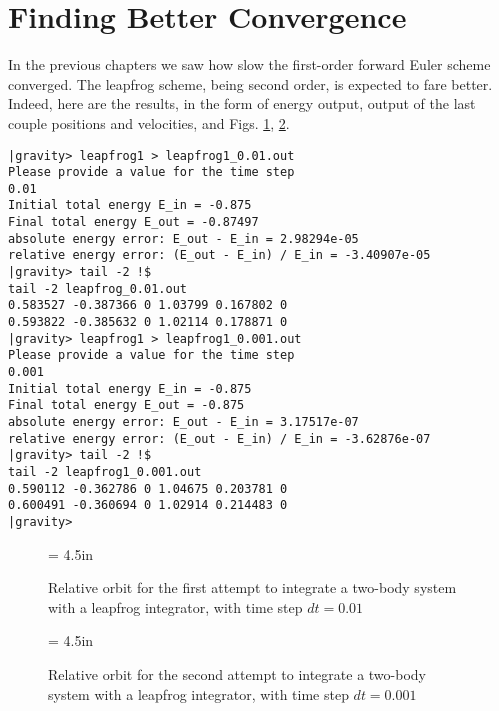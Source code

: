 \section{Finding Better Convergence}

In the previous chapters we saw how slow the first-order forward Euler
scheme converged.  The leapfrog scheme, being second order, is
expected to fare better.  Indeed, here are the results, in the form of
energy output, output of the last couple positions and velocities, and
Figs. \ref{fig:leap1-0.01}, \ref{fig:leap1-0.001}.

\begin{small}
\begin{verbatim}
|gravity> leapfrog1 > leapfrog1_0.01.out
Please provide a value for the time step
0.01
Initial total energy E_in = -0.875
Final total energy E_out = -0.87497
absolute energy error: E_out - E_in = 2.98294e-05
relative energy error: (E_out - E_in) / E_in = -3.40907e-05
|gravity> tail -2 !$
tail -2 leapfrog_0.01.out
0.583527 -0.387366 0 1.03799 0.167802 0
0.593822 -0.385632 0 1.02114 0.178871 0
|gravity> leapfrog1 > leapfrog1_0.001.out
Please provide a value for the time step
0.001
Initial total energy E_in = -0.875
Final total energy E_out = -0.875
absolute energy error: E_out - E_in = 3.17517e-07
relative energy error: (E_out - E_in) / E_in = -3.62876e-07
|gravity> tail -2 !$
tail -2 leapfrog1_0.001.out
0.590112 -0.362786 0 1.04675 0.203781 0
0.600491 -0.360694 0 1.02914 0.214483 0
|gravity>
\end{verbatim}
\end{small}

\begin{figure}[htb]
\begin{center}
\epsfxsize = 4.5in
\caption[Two-body orbit with a leapfrog integrator, time step $dt = 0.01$]
{Relative orbit for the first attempt to integrate a two-body system with a
leapfrog integrator, with time step $dt = 0.01$}
\label{fig:leap1-0.01}
\end{center}
\end{figure}

\begin{figure}[htb]
\begin{center}
\epsfxsize = 4.5in
\caption[Two-body orbit with a leapfrog integrator, time step $dt = 0.001$]
{Relative orbit for the second attempt to integrate a two-body system with a
leapfrog integrator, with time step $dt = 0.001$}
\label{fig:leap1-0.001}
\end{center}
\end{figure}

